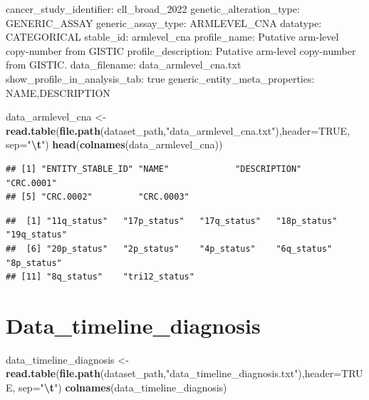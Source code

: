 \documentclass[
]{article}
\newenvironment{Shaded}{\begin{snugshade}}{\end{snugshade}}
\newcommand{\AttributeTok}[1]{\textcolor[rgb]{0.13,0.29,0.53}{#1}}
\newcommand{\ConstantTok}[1]{\textcolor[rgb]{0.56,0.35,0.01}{#1}}
\newcommand{\FunctionTok}[1]{\textcolor[rgb]{0.13,0.29,0.53}{\textbf{#1}}}
\newcommand{\NormalTok}[1]{#1}
\newcommand{\OtherTok}[1]{\textcolor[rgb]{0.56,0.35,0.01}{#1}}
\newcommand{\SpecialCharTok}[1]{\textcolor[rgb]{0.81,0.36,0.00}{\textbf{#1}}}
\newcommand{\StringTok}[1]{\textcolor[rgb]{0.31,0.60,0.02}{#1}}
\begin{document}
cancer\_study\_identifier: cll\_broad\_2022 genetic\_alteration\_type:
GENERIC\_ASSAY generic\_assay\_type: ARMLEVEL\_CNA datatype: CATEGORICAL
stable\_id: armlevel\_cna profile\_name: Putative arm-level copy-number
from GISTIC profile\_description: Putative arm-level copy-number from
GISTIC. data\_filename: data\_armlevel\_cna.txt
show\_profile\_in\_analysis\_tab: true
generic\_entity\_meta\_properties: NAME,DESCRIPTION

\begin{Shaded}
\begin{Highlighting}[]
\NormalTok{data\_armlevel\_cna   }\OtherTok{\textless{}{-}} \FunctionTok{read.table}\NormalTok{(}\FunctionTok{file.path}\NormalTok{(dataset\_path,}\StringTok{"data\_armlevel\_cna.txt"}\NormalTok{),}\AttributeTok{header=}\ConstantTok{TRUE}\NormalTok{, }\AttributeTok{sep=}\StringTok{"}\SpecialCharTok{\textbackslash{}t}\StringTok{"}\NormalTok{) }
\FunctionTok{head}\NormalTok{(}\FunctionTok{colnames}\NormalTok{(data\_armlevel\_cna))}
\end{Highlighting}
\end{Shaded}

\begin{verbatim}
## [1] "ENTITY_STABLE_ID" "NAME"             "DESCRIPTION"      "CRC.0001"        
## [5] "CRC.0002"         "CRC.0003"
\end{verbatim}

\begin{Shaded}
\end{Shaded}

\begin{verbatim}
##  [1] "11q_status"   "17p_status"   "17q_status"   "18p_status"   "19q_status"  
##  [6] "20p_status"   "2p_status"    "4p_status"    "6q_status"    "8p_status"   
## [11] "8q_status"    "tri12_status"
\end{verbatim}

\section{Data\_timeline\_diagnosis}\label{data_timeline_diagnosis}

\begin{Shaded}
\begin{Highlighting}[]
\NormalTok{data\_timeline\_diagnosis  }\OtherTok{\textless{}{-}} \FunctionTok{read.table}\NormalTok{(}\FunctionTok{file.path}\NormalTok{(dataset\_path,}\StringTok{"data\_timeline\_diagnosis.txt"}\NormalTok{),}\AttributeTok{header=}\ConstantTok{TRUE}\NormalTok{, }\AttributeTok{sep=}\StringTok{"}\SpecialCharTok{\textbackslash{}t}\StringTok{"}\NormalTok{)                 }
\FunctionTok{colnames}\NormalTok{(data\_timeline\_diagnosis)}
\end{Highlighting}
\end{Shaded}
\end{document}
